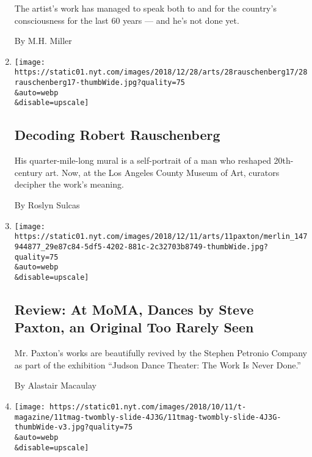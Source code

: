 \begin{enumerate}
  The artist's work has managed to speak both to and for the country's
  consciousness for the last 60 years --- and he's not done yet.

  By M.H. Miller
\item
  \href{/2018/12/24/arts/design/rauschenberg-quarter-mile-mural-lacma.html}{}

  \texttt{[image: https://static01.nyt.com/images/2018/12/28/arts/28rauschenberg17/28rauschenberg17-thumbWide.jpg?quality=75\\\&auto=webp\\\&disable=upscale]}

  \hypertarget{decoding-robert-rauschenberg}{%
  \subsection{Decoding Robert
  Rauschenberg}\label{decoding-robert-rauschenberg}}

  His quarter-mile-long mural is a self-portrait of a man who reshaped
  20th-century art. Now, at the Los Angeles County Museum of Art,
  curators decipher the work's meaning.

  By Roslyn Sulcas
\item
  \href{/2018/12/10/arts/dance/review-steve-paxton-dance-moma.html}{}

  \texttt{[image: https://static01.nyt.com/images/2018/12/11/arts/11paxton/merlin\_147944877\_29e87c84-5df5-4202-881c-2c32703b8749-thumbWide.jpg?quality=75\\\&auto=webp\\\&disable=upscale]}

  \hypertarget{review-at-moma-dances-by-steve-paxton-an-original-too-rarely-seen}{%
  \subsection{Review: At MoMA, Dances by Steve Paxton, an Original Too
  Rarely
  Seen}\label{review-at-moma-dances-by-steve-paxton-an-original-too-rarely-seen}}

  Mr. Paxton's works are beautifully revived by the Stephen Petronio
  Company as part of the exhibition ``Judson Dance Theater: The Work Is
  Never Done.''

  By Alastair Macaulay
\item
  \href{/2018/10/11/t-magazine/cy-twombly-robert-rauschenberg-art-travel.html}{}

  \texttt{[image: https://static01.nyt.com/images/2018/10/11/t-magazine/11tmag-twombly-slide-4J3G/11tmag-twombly-slide-4J3G-thumbWide-v3.jpg?quality=75\\\&auto=webp\\\&disable=upscale]}

  \hypertarget{histories-and-happenings}{%
}
\end{enumerate}

